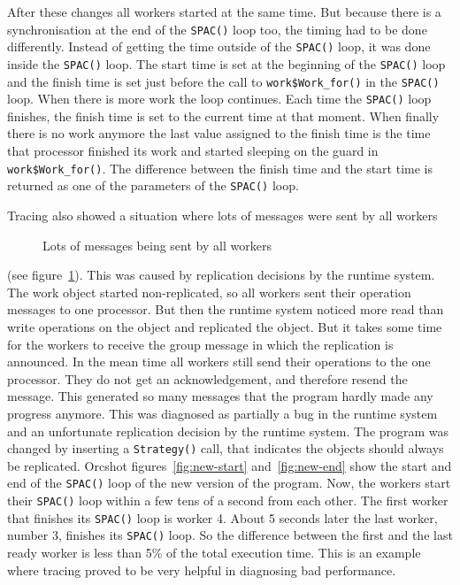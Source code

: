 \documentclass[a4paper,11pt]{article}
\begin{document}
After these changes all workers started at the same time. But because there
is a synchronisation at the end of the {\tt SPAC()} loop too,
the timing had to be done differently. Instead of getting the
time outside of the {\tt SPAC()} loop, it was done inside the
{\tt SPAC()} loop. The start time is set at the
beginning of the {\tt SPAC()} loop and the finish time is set just before
the call to {\tt work\$Work\_for()} in the {\tt SPAC()} loop. When there is
more work the loop continues. Each time the {\tt SPAC()} loop finishes,
the finish time is set to
the current time at that moment. When finally there is no work anymore the
last value assigned to the finish time is the time that processor finished
its work and started sleeping on the guard in {\tt work\$Work\_for()}.
The difference between the finish time and the start time
is returned as one of the parameters of the {\tt SPAC()} loop.

Tracing also showed a situation where lots of messages were
sent by all workers
\begin{figure}[htbp]
\begin{center}
\caption{Lots of messages being sent by all workers}
\label{fig:trashing}
\end{center}
\end{figure}
(see figure~\ref{fig:trashing}). This was caused by replication decisions
by the runtime system.
The work object started non-replicated, so all workers sent
their operation messages to one processor. But then the runtime system
noticed more
read than write operations on the object and replicated the object. But
it takes some time for the workers to receive the group message in which
the replication is announced. In the mean time all workers still send their
operations to the one processor.
They do not get an acknowledgement, and therefore
resend the message. This generated so many messages that the program
hardly made any progress anymore. This was diagnosed as partially a
bug in the 
runtime system and an unfortunate replication decision by the runtime
system. The program
was changed by inserting a {\tt Strategy()} call, that indicates the objects
should always be replicated.
Orcshot figures~\ref{fig:new-start} and~\ref{fig:new-end} show the
start and end of the {\tt SPAC()} loop of the new version of the program.
Now, the workers start their {\tt SPAC()} loop within
a few tens of a second from each other. The first worker that finishes
its {\tt SPAC()} loop is worker 4. About 5 seconds later the last
worker, number 3, finishes its {\tt SPAC()} loop. So the difference
between the first and the last ready worker is
less than 5\% of the total execution time.
This is an example where tracing proved
to be very helpful in diagnosing bad performance.
\end{document}
